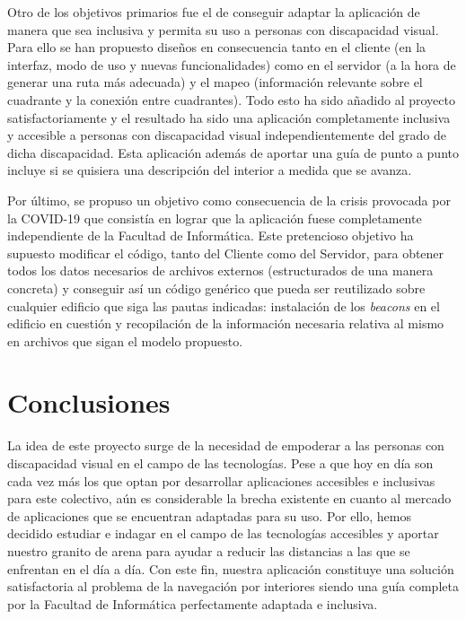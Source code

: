 Otro de los objetivos primarios fue el de conseguir adaptar la aplicación de manera que sea inclusiva y permita su uso a personas con discapacidad visual. Para ello se han propuesto diseños en consecuencia tanto en el cliente (en la interfaz, modo de uso y nuevas funcionalidades) como en el servidor (a la hora de generar una ruta más adecuada) y el mapeo (información relevante sobre el cuadrante y la conexión entre cuadrantes). Todo esto ha sido añadido al proyecto satisfactoriamente y el resultado ha sido una aplicación completamente inclusiva y accesible a personas con discapacidad visual independientemente del grado de dicha discapacidad. Esta aplicación además de aportar una guía de punto a punto incluye si se quisiera una descripción del interior a medida que se avanza.

Por último, se propuso un objetivo como consecuencia de la crisis provocada por la COVID-19 que consistía en lograr que la aplicación fuese completamente independiente de la Facultad de Informática. Este pretencioso objetivo ha supuesto modificar el código, tanto del Cliente como del Servidor, para obtener todos los datos necesarios de archivos externos (estructurados de una manera concreta) y conseguir así un código genérico que pueda ser reutilizado sobre cualquier edificio que siga las pautas indicadas: instalación de los \textit{beacons} en el edificio en cuestión y recopilación de la información necesaria relativa al mismo en archivos que sigan el modelo propuesto.


\section{Conclusiones}

La idea de este proyecto surge de la necesidad de empoderar a las personas con discapacidad visual en el campo de las tecnologías. Pese a que hoy en día son cada vez más los que optan por desarrollar aplicaciones accesibles e inclusivas para este colectivo, aún es considerable la brecha existente en cuanto al mercado de aplicaciones que se encuentran adaptadas para su uso. Por ello, hemos decidido estudiar e indagar en el campo de las tecnologías accesibles y aportar nuestro granito de arena para ayudar a reducir las distancias a las que se enfrentan en el día a día. Con este fin, nuestra aplicación constituye una solución satisfactoria al problema de la navegación por interiores siendo una guía completa por la Facultad de Informática perfectamente adaptada e inclusiva.


